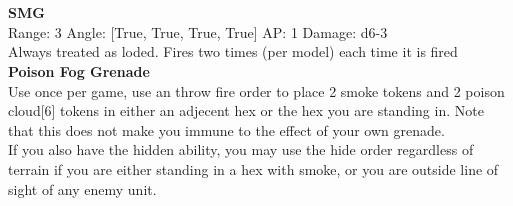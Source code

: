 \ \\

\ \\
{\bf SMG } \\



Range: 3  Angle: [True, True, True, True] AP: 1 Damage: d6-3 \\
Always treated as loded. Fires two times (per model) each time it is fired\\ 




{\bf Poison Fog Grenade } \\

Use once per game, use an throw fire order to place 2 smoke tokens and 2 poison cloud[6] tokens in either an adjecent hex or the hex you are standing in. Note that this does not make you immune to the effect of your own grenade.\\ 
If you also have the hidden ability, you may use the hide order regardless of terrain if you are either standing in a hex with smoke, or you are outside line of sight of any enemy unit. \\ 





 
\ \\














